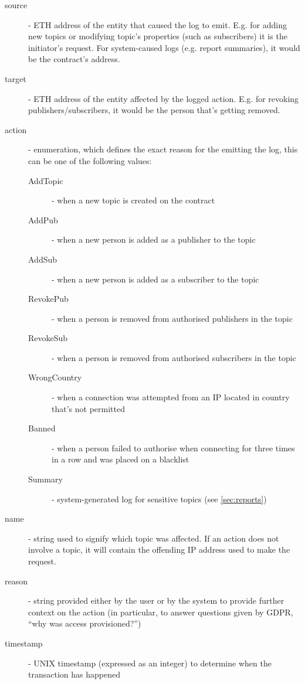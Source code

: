 \begin{description}
    \item[source] - ETH address of the entity that caused the log to emit. E.g. for adding new topics or modifying topic's properties (such as subscribers) it is the initiator's request. For system-caused logs (e.g. report summaries), it would be the contract's address.
    \item[target] - ETH address of the entity affected by the logged action. E.g. for revoking publishers/subscribers, it would be the person that's getting removed.
    \item[action] - enumeration, which defines the exact reason for the emitting the log, this can be one of the following values:
    \begin{description}
        \item[AddTopic] - when a new topic is created on the contract
        \item[AddPub] - when a new person is added as a publisher to the topic
        \item[AddSub] - when a new person is added as a subscriber to the topic
        \item[RevokePub] - when a person is removed from authorised publishers in the topic
        \item[RevokeSub] - when a person is removed from authorised subscribers in the topic
        \item[WrongCountry] - when a connection was attempted from an IP located in country that's not permitted
        \item[Banned] - when a person failed to authorise when connecting for three times in a row and was placed on a blacklist
        \item[Summary] - system-generated log for sensitive topics (see \ref{sec:reports})
    \end{description}
    \item[name] - string used to signify which topic was affected. If an action does not involve a topic, it will contain the offending IP address used to make the request.
    \item[reason] - string provided either by the user or by the system to provide further context on the action (in particular, to answer questions given by GDPR, ``why was access provisioned?'')
    \item[timestamp] - UNIX timestamp (expressed as an integer) to determine when the transaction has happened
\end{description}
